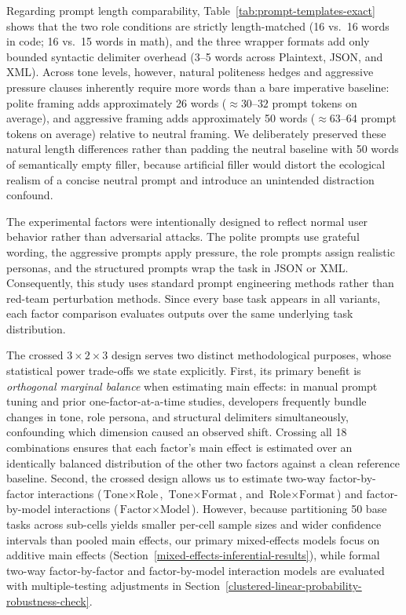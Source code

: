 \documentclass[a4paper,fleqn]{cas-sc}
\begin{document}
Regarding prompt length comparability, Table~\ref{tab:prompt-templates-exact} shows that the two role conditions are strictly length-matched (16 vs.\ 16 words in code; 16 vs.\ 15 words in math), and the three wrapper formats add only bounded syntactic delimiter overhead (3--5 words across Plaintext, JSON, and XML). Across tone levels, however, natural politeness hedges and aggressive pressure clauses inherently require more words than a bare imperative baseline: polite framing adds approximately 26 words ($\approx 30$--$32$ prompt tokens on average), and aggressive framing adds approximately 50 words ($\approx 63$--$64$ prompt tokens on average) relative to neutral framing. We deliberately preserved these natural length differences rather than padding the neutral baseline with 50 words of semantically empty filler, because artificial filler would distort the ecological realism of a concise neutral prompt and introduce an unintended distraction confound.

The experimental factors were intentionally designed to reflect normal user behavior rather than adversarial attacks. The polite prompts use grateful wording, the aggressive prompts apply pressure, the role prompts assign realistic personas, and the structured prompts wrap the task in JSON or XML. Consequently, this study uses standard prompt engineering methods rather than red-team perturbation methods. Since every base task appears in all variants, each factor comparison evaluates outputs over the same underlying task distribution.

The crossed $3 \times 2 \times 3$ design serves two distinct methodological purposes, whose statistical power trade-offs we state explicitly. First, its primary benefit is \emph{orthogonal marginal balance} when estimating main effects: in manual prompt tuning and prior one-factor-at-a-time studies, developers frequently bundle changes in tone, role persona, and structural delimiters simultaneously, confounding which dimension caused an observed shift. Crossing all 18 combinations ensures that each factor's main effect is estimated over an identically balanced distribution of the other two factors against a clean reference baseline. Second, the crossed design allows us to estimate two-way factor-by-factor interactions ($\text{Tone} \times \text{Role}$, $\text{Tone} \times \text{Format}$, and $\text{Role} \times \text{Format}$) and factor-by-model interactions ($\text{Factor} \times \text{Model}$). However, because partitioning 50 base tasks across sub-cells yields smaller per-cell sample sizes and wider confidence intervals than pooled main effects, our primary mixed-effects models focus on additive main effects (Section~\ref{mixed-effects-inferential-results}), while formal two-way factor-by-factor and factor-by-model interaction models are evaluated with multiple-testing adjustments in Section~\ref{clustered-linear-probability-robustness-check}.
\end{document}
